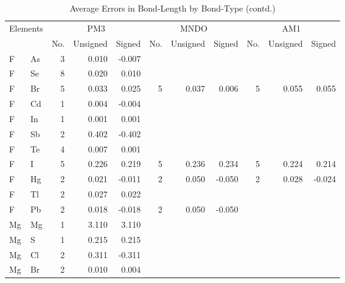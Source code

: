 \begin{table}
\caption{\label{avegeosc} Average Errors in Bond-Length by Bond-Type (contd.)} 
\compresstable
\begin{center}
\begin{tabular}{llrrrrrrrrr}
\multicolumn{2}{c}{Elements} & \multicolumn{3}{c}{PM3} &
\multicolumn{3}{c}{MNDO} & \multicolumn{3}{c}{AM1} \\
 & &  No. & Unsigned & Signed & No. & Unsigned & Signed & No. & Unsigned & Signed \\ \hline
  F &  As &   3 &    0.010 &   -0.007 &     &          &          &     &          &          \\
  F &  Se &   8 &    0.020 &    0.010 &     &          &          &     &          &          \\
  F &  Br &   5 &    0.033 &    0.025 &   5 &    0.037 &    0.006 &   5 &    0.055 &    0.055 \\
  F &  Cd &   1 &    0.004 &   -0.004 &     &          &          &     &          &          \\
  F &  In &   1 &    0.001 &    0.001 &     &          &          &     &          &          \\
  F &  Sb &   2 &    0.402 &   -0.402 &     &          &          &     &          &          \\
  F &  Te &   4 &    0.007 &    0.001 &     &          &          &     &          &          \\
  F &   I &   5 &    0.226 &    0.219 &   5 &    0.236 &    0.234 &   5 &    0.224 &    0.214 \\
  F &  Hg &   2 &    0.021 &   -0.011 &   2 &    0.050 &   -0.050 &   2 &    0.028 &   -0.024 \\
  F &  Tl &   2 &    0.027 &    0.022 &     &          &          &     &          &          \\
  F &  Pb &   2 &    0.018 &   -0.018 &   2 &    0.050 &   -0.050 &     &          &          \\
 Mg &  Mg &   1 &    3.110 &    3.110 &     &          &          &     &          &          \\
 Mg &   S &   1 &    0.215 &    0.215 &     &          &          &     &          &          \\
 Mg &  Cl &   2 &    0.311 &   -0.311 &     &          &          &     &          &          \\
 Mg &  Br &   2 &    0.010 &    0.004 &     &          &          &     &          &          \\

\end{tabular}
\end{center}
\end{table}
